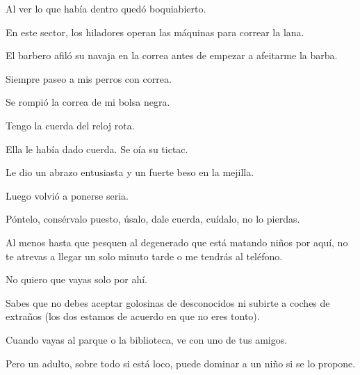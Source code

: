 \sk
Al ver lo que había dentro quedó
boquiabierto.

\sk
En este sector, los hiladores operan las máquinas para correar la lana. 

\sk
El barbero afiló su navaja en la correa antes de empezar a afeitarme la barba. 

\sk
Siempre paseo a mis perros con correa. 

\sk
Se rompió la correa de mi bolsa negra. 

\sk
Tengo la cuerda del reloj rota. 

\sk
Ella le había dado cuerda. Se oía su tictac.

\sk
Le dio un abrazo entusiasta y un fuerte beso en la mejilla.

\sk
Luego volvió a ponerse seria.

\sk
Póntelo, consérvalo puesto, úsalo, dale
cuerda, cuídalo, no lo pierdas.

\sk
Al menos hasta que pesquen al degenerado que está
matando niños por aquí, no te atrevas a llegar un
solo minuto tarde o me tendrás al teléfono.

\sk
No quiero que vayas solo por ahí.

\sk
Sabes que no debes aceptar golosinas de
desconocidos ni subirte a coches de extraños (los
dos estamos de acuerdo en que no eres tonto).

\sk
Cuando vayas al parque o la biblioteca,
ve con uno de tus amigos.

\sk
Pero un adulto, sobre
todo si está loco, puede dominar a un niño si se lo
propone. 

